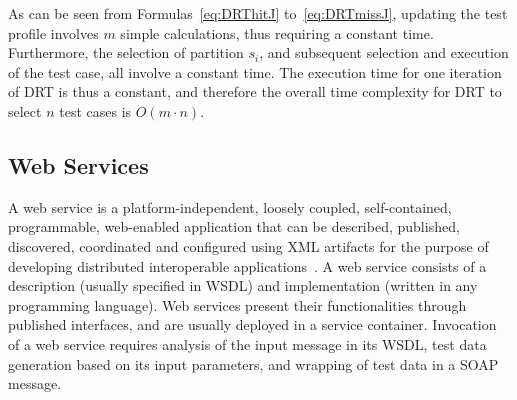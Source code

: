 \documentclass[10pt,journal,compsoc]{IEEEtran}
\begin{document}
As can be seen from Formulas~\ref{eq:DRThitJ} to~\ref{eq:DRTmissJ},  updating the test profile involves $m$ simple calculations, thus requiring a constant time.
Furthermore, the selection of partition $s_i$, and subsequent selection and execution of the test case, all involve a constant time.
The execution time for one iteration of DRT is thus a constant, and therefore the overall time complexity for DRT to select $n$ test cases is $O(m \cdot n)$.

\subsection{Web Services}
\label{sec:webservices}

A web service is a platform-independent, loosely coupled, self-contained, programmable, web-enabled application that can be described, published, discovered, coordinated and configured using XML artifacts for the purpose of developing distributed interoperable applications~\cite{papazoglou2008service}.
A web service consists of a description (usually specified in WSDL) and implementation (written in any programming language).
Web services present their functionalities through published interfaces, and are usually deployed in a service container.
Invocation of a web service requires analysis of the input message in its WSDL, test data generation based on its input parameters, and wrapping of test data in a SOAP message.
\end{document}
